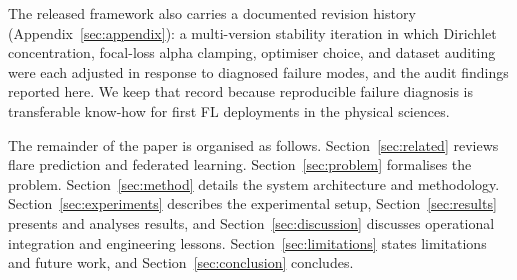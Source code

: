 The released framework also carries a documented revision history
(Appendix~\ref{sec:appendix}): a multi-version stability iteration in
which Dirichlet concentration, focal-loss alpha clamping, optimiser
choice, and dataset auditing were each adjusted in response to
diagnosed failure modes, and the audit findings reported here.
We keep that record because reproducible failure diagnosis is
transferable know-how for first FL deployments in the physical
sciences.

The remainder of the paper is organised as follows.
Section~\ref{sec:related} reviews flare prediction and federated
learning. Section~\ref{sec:problem} formalises the problem.
Section~\ref{sec:method} details the system architecture and
methodology. Section~\ref{sec:experiments} describes the experimental
setup, Section~\ref{sec:results} presents and analyses results, and
Section~\ref{sec:discussion} discusses operational integration and
engineering lessons. Section~\ref{sec:limitations} states limitations
and future work, and Section~\ref{sec:conclusion} concludes.

